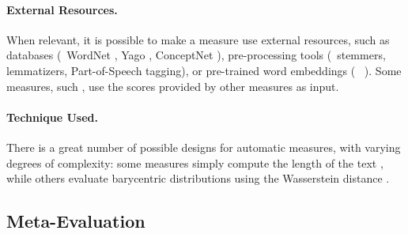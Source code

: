 \paragraph{External Resources.} When relevant, it is possible to make a measure use external resources, such as databases ({\eg}\ WordNet \citep{miller1995wordnet}, Yago \citep{suchanek2007yago}, ConceptNet \citep{speer2017conceptnet}), pre-processing tools ({\eg}\ stemmers, lemmatizers, Part-of-Speech tagging), or pre-trained word embeddings ({\eg}\ {\wvec} \citep{mikolov2013distributed}). Some measures, such {\nneval} \citep{sharif2018nneval}, use the scores provided by other measures as input.

\paragraph{Technique Used.} There is a great number of possible designs for automatic measures, with varying degrees of complexity: some measures simply compute the length of the text \citep{fabbri2021summeval}, while others evaluate barycentric distributions using the Wasserstein distance \citep{colombo2021automatic}.

\subsection{Meta-Evaluation}
\label{sub:background_meta_evaluation}


